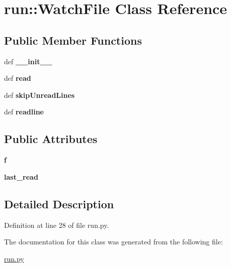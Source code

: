 \hypertarget{classrun_1_1_watch_file}{
\section{run\-:\-:\-Watch\-File \-Class \-Reference}
\label{classrun_1_1_watch_file}
}
\subsection*{\-Public \-Member \-Functions}
\begin{DoxyCompactItemize}
\item 
\hypertarget{classrun_1_1_watch_file_a7ab44e72a2091feabfe9acefd18c3fd0}{
def {\bfseries \-\_\-\-\_\-init\-\_\-\-\_\-}}
\label{classrun_1_1_watch_file_a7ab44e72a2091feabfe9acefd18c3fd0}

\item 
\hypertarget{classrun_1_1_watch_file_ade03d5177e0dba8296825c14fb14b083}{
def {\bfseries read}}
\label{classrun_1_1_watch_file_ade03d5177e0dba8296825c14fb14b083}

\item 
\hypertarget{classrun_1_1_watch_file_ae4a30e80b9ffdb85a458c2107e6978d6}{
def {\bfseries skip\-Unread\-Lines}}
\label{classrun_1_1_watch_file_ae4a30e80b9ffdb85a458c2107e6978d6}

\item 
\hypertarget{classrun_1_1_watch_file_a209ed926b223119ee3e9e3d6747e01fb}{
def {\bfseries readline}}
\label{classrun_1_1_watch_file_a209ed926b223119ee3e9e3d6747e01fb}

\end{DoxyCompactItemize}
\subsection*{\-Public \-Attributes}
\begin{DoxyCompactItemize}
\item 
\hypertarget{classrun_1_1_watch_file_affd50613a02c7f9bdcb7e0feb6700886}{
{\bfseries f}}
\label{classrun_1_1_watch_file_affd50613a02c7f9bdcb7e0feb6700886}

\item 
\hypertarget{classrun_1_1_watch_file_adf192ca47f19d04d16b4fec4bb65d064}{
{\bfseries last\-\_\-read}}
\label{classrun_1_1_watch_file_adf192ca47f19d04d16b4fec4bb65d064}

\end{DoxyCompactItemize}


\subsection{\-Detailed \-Description}


\-Definition at line 28 of file run.\-py.



\-The documentation for this class was generated from the following file\-:\begin{DoxyCompactItemize}
\item 
\hyperlink{run_8py}{run.\-py}\end{DoxyCompactItemize}
